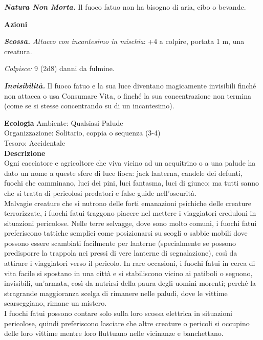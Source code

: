 \begin{multicols}{2}
\emph{\textbf{Natura Non Morta.}} Il fuoco fatuo non ha bisogno di aria, cibo o bevande.

\textbf{Azioni}

\emph{\textbf{Scossa.} Attacco con incantesimo in mischia}: +4 a colpire, portata 1 m, una creatura.

\emph{Colpisce:} 9 (2d8) danni da fulmine.

\emph{\textbf{Invisibilità.}} Il fuoco fatuo e la sua luce diventano magicamente invisibili finché non attacca o usa Consumare Vita, o finché la sua concentrazione non termina (come se si stesse concentrando su di un incantesimo).

\textbf{Ecologia}
Ambiente: Qualsiasi Palude\\
Organizzazione: Solitario, coppia o sequenza (3-4)\\
Tesoro: Accidentale\\
\textbf{Descrizione}\\
Ogni cacciatore e agricoltore che viva vicino ad un acquitrino o a una palude ha dato un nome a queste sfere di luce fioca: jack lanterna, candele dei defunti, fuochi che camminano, luci dei pini, luci fantasma, luci di giunco; ma tutti sanno che si tratta di pericolosi predatori e false guide nell'oscurità.\\

Malvagie creature che si nutrono delle forti emanazioni psichiche delle creature terrorizzate, i fuochi fatui traggono piacere nel mettere i viaggiatori creduloni in situazioni pericolose. Nelle terre selvagge, dove sono molto comuni, i fuochi fatui preferiscono tattiche semplici come posizionarsi su scogli o sabbie mobili dove possono essere scambiati facilmente per lanterne (specialmente se possono predisporre la trappola nei pressi di vere lanterne di segnalazione), così da attirare i viaggiatori verso il pericolo. In rare occasioni, i fuochi fatui in cerca di vita facile si spostano in una città e si stabiliscono vicino ai patiboli o seguono, invisibili, un'armata, così da nutrirsi della paura degli uomini morenti; perché la stragrande maggioranza scelga di rimanere nelle paludi, dove le vittime scarseggiano, rimane un mistero.\\

I fuochi fatui possono contare solo sulla loro scossa elettrica in situazioni pericolose, quindi preferiscono lasciare che altre creature o pericoli si occupino delle loro vittime mentre loro fluttuano nelle vicinanze e banchettano.\\


\end{multicols}
